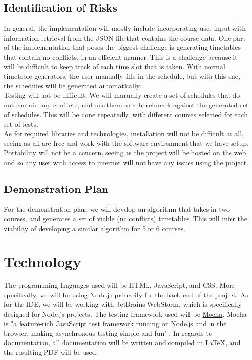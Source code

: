 \documentclass[12pt]{article}
\begin{document}
\subsection{Identification of Risks}
In general, the implementation will mostly include incorporating user input with information retrieval from the JSON file that contains the course data. One part of the implementation that poses the biggest challenge is generating timetables that contain no conflicts, in an efficient manner. This is a challenge because it will be difficult to keep track of each time slot that is taken. With normal timetable generators, the user manually fills in the schedule, but with this one, the schedules will be generated automatically. \\

Testing will not be difficult. We will manually create a set of schedules that do not contain any conflicts, and use them as a benchmark against the generated set of schedules. This will be done repeatedly, with different courses selected for each set of tests. \\

As for required libraries and technologies, installation will not be difficult at all, seeing as all are free and work with the software environment that we have setup. Portability will not be a concern, seeing as the project will be hosted on the web, and so any user with access to internet will not have any issues using the project.

\newpage
\subsection{Demonstration Plan}
For the demonstration plan, we will develop an algorithm that takes in two courses, and generates a set of viable (no conflicts) timetables. This will infer the viability of developing a similar algorithm for 5 or 6 courses.
\section{Technology}
The programming languages used will be HTML, JavaScript, and CSS. More specifically, we will be using Node.js primarily for the back-end of the project. As for the IDE, we will be working with JetBrains WebStorm, which is specifically designed for Node.js projects. The testing framework used will be \href{https://mochajs.org/}{Mocha}. Mocha is "a feature-rich JavaScript test framework running on Node.js and in the browser, making asynchronous testing simple and fun" \cite{1}. In regards to documentation, all documentation will be written and compiled in \LaTeX , and the resulting PDF will be used.
\end{document}
